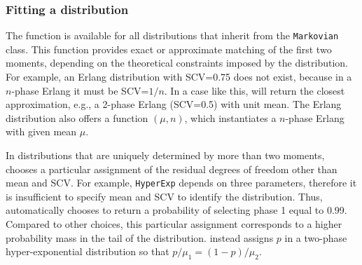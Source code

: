 \subsubsection{Fitting a distribution}
The  function is available for all distributions that inherit from the \texttt{Markovian} class. This function provides exact or approximate matching of the first two moments, depending on the theoretical constraints imposed by the distribution. For example, an Erlang distribution with SCV=0.75 does not exist, because in a $n$-phase Erlang it must be SCV=$1/n$. In a case like this,  will return the closest approximation, e.g., a 2-phase Erlang (SCV=0.5) with unit mean. The Erlang distribution also offers a function $(\mu,n)$, which instantiates a $n$-phase Erlang with given mean $\mu$.

In distributions that are uniquely determined by more than two moments,  chooses a particular assignment of the residual degrees of freedom other than mean and SCV. For example, \texttt{HyperExp} depends on three parameters, therefore it is insufficient to specify mean and SCV to identify the distribution. Thus,  automatically chooses to return a probability of selecting phase 1 equal to 0.99. Compared to other choices, this particular assignment corresponds to a higher probability mass in the tail of the distribution.  instead assigns $p$ in a two-phase hyper-exponential distribution so that $p/\mu_1 = (1-p)/\mu_2$.

